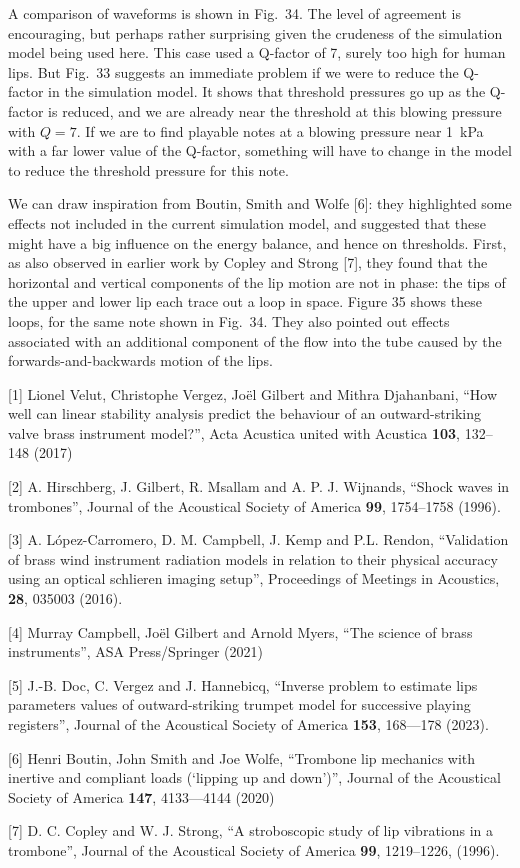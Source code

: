   A comparison of waveforms is shown in Fig.\ 34. The level of agreement is 
  encouraging, but perhaps rather surprising given the crudeness of the 
  simulation model being used here. This case used a Q-factor of 7, surely too 
  high for human lips. But Fig.\ 33 suggests an immediate problem if we were to 
  reduce the Q-factor in the simulation model. It shows that threshold 
  pressures go up as the Q-factor is reduced, and we are already near the 
  threshold at this blowing pressure with $Q=7$. If we are to find playable 
  notes at a blowing pressure near 1~kPa with a far lower value of the 
  Q-factor, something will have to change in the model to reduce the threshold 
  pressure for this note. 

  We can draw inspiration from Boutin, Smith and Wolfe [6]: they highlighted 
  some effects not included in the current simulation model, and suggested that 
  these might have a big influence on the energy balance, and hence on 
  thresholds. First, as also observed in earlier work by Copley and Strong [7], 
  they found that the horizontal and vertical components of the lip motion are 
  not in phase: the tips of the upper and lower lip each trace out a loop in 
  space. Figure 35 shows these loops, for the same note shown in Fig.\ 34. They 
  also pointed out effects associated with an additional component of the flow 
  into the tube caused by the forwards-and-backwards motion of the lips. 



  \sectionreferences{}[1] Lionel Velut, Christophe Vergez, Joël Gilbert and 
  Mithra Djahanbani, “How well can linear stability analysis predict the 
  behaviour of an outward-striking valve brass instrument model?”, Acta 
  Acustica united with Acustica \textbf{103}, 132–148 (2017) 

  [2] A. Hirschberg, J. Gilbert, R. Msallam and A. P. J. Wijnands, “Shock waves 
  in trombones”, Journal of the Acoustical Society of America \textbf{99}, 
  1754–1758 (1996). 

  [3] A. López-Carromero, D. M. Campbell, J. Kemp and P.L. Rendon, “Validation 
  of brass wind instrument radiation models in relation to their physical 
  accuracy using an optical schlieren imaging setup”, Proceedings of Meetings 
  in Acoustics, \textbf{28}, 035003 (2016). 

  [4] Murray Campbell, Joël Gilbert and Arnold Myers, “The science of brass 
  instruments”, ASA Press/Springer (2021) 

  [5] J.-B. Doc, C. Vergez and J. Hannebicq, “Inverse problem to estimate lips 
  parameters values of outward-striking trumpet model for successive playing 
  registers”, Journal of the Acoustical Society of America \textbf{153}, 
  168—178 (2023). 

  [6] Henri Boutin, John Smith and Joe Wolfe, “Trombone lip mechanics with 
  inertive and compliant loads (‘lipping up and down’)”, Journal of the 
  Acoustical Society of America \textbf{147}, 4133—4144 (2020) 

  [7] D. C. Copley and W. J. Strong, “A stroboscopic study of lip vibrations in 
  a trombone”, Journal of the Acoustical Society of America \textbf{99}, 
  1219–1226, (1996). 